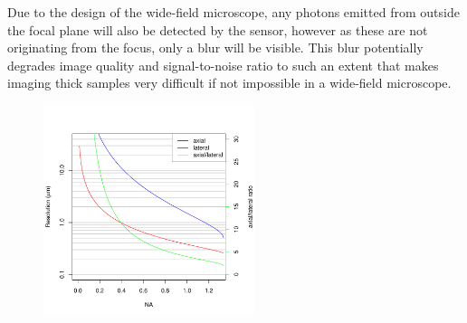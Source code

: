   Due to the design of the wide-field microscope, any photons emitted from outside the focal plane will also be detected by the sensor, however as these are not originating from the focus, only a blur will be visible. This blur potentially degrades image quality and signal-to-noise ratio to such an extent that makes imaging thick samples very difficult if not impossible in a wide-field microscope. 


  \begin{figure}
    \centering
    \includegraphics[width=0.55\textwidth]{resolution}
    \label{fig:resolution}
  \end{figure}

